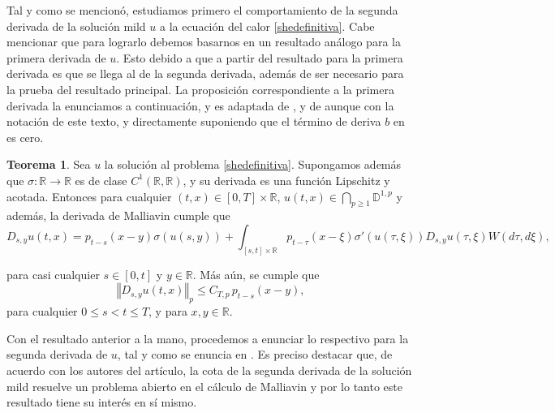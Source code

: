 \documentclass[letterpaper,twoside,12pt]{book}
\newcommand{\R}{\mathbb{R}}
\newcommand{\D}{\mathbb{D}}
\newcommand{\1}{\mathds{1}}
\renewcommand{\to}{\rightarrow}
\newcommand{\norm}[1]{\left\Vert #1 \right\Vert}
\theoremstyle{definition}
\theoremstyle{definition}
\newtheorem{teo}{Teorema}
\theoremstyle{remark}
\theoremstyle{definition}
\theoremstyle{definition}
\theoremstyle{definition}
\theoremstyle{definition}
\theoremstyle{definition}
\begin{document}
Tal y como se mencionó, estudiamos primero el comportamiento de la segunda derivada de la solución mild $u$ a la ecuación del calor \eqref{shedefinitiva}. Cabe mencionar que para lograrlo debemos basarnos en un resultado análogo para la primera derivada de $u$. Esto debido a que a partir del resultado para la primera derivada es que se llega al de la segunda derivada, además de ser necesario para la prueba del resultado principal. La proposición correspondiente a la primera derivada la enunciamos a continuación, y es adaptada de \cite[proposición 5.1]{Nualart2007}, y de \cite[sección 4.1]{KUZGUN202268} aunque con la notación de este texto, y directamente suponiendo que el término de deriva $b$ en \cite{Nualart2007} es cero.

\begin{teo}\label{teocota1eraderivada}
   Sea $u$ la solución al problema \eqref{shedefinitiva}. Supongamos además que $\sigma:\R\to\R$ es de clase $C^1(\R,\R)$, y su derivada es una función Lipschitz y acotada. Entonces para cualquier $(t,x)\in [0,T]\times\R$, $u(t,x)\in\bigcap_{p\geq1}\D^{1,p}$ y además, la derivada de Malliavin cumple que 
   \begin{equation}\label{formula1eraderivada}
      D_{s,y}u(t,x)=p_{t-s}(x-y)\sigma(u(s,y))+ \int_{[s,t]\times\R} p_{t-\tau}(x-\xi)\sigma'(u(\tau,\xi))D_{s,y}u(\tau,\xi)W(d\tau,d\xi),
   \end{equation}
   
   para casi cualquier $s\in [0,t]$ y $y\in \R$. Más aún, se cumple que 
   \begin{equation}\label{cota1eraderivada} 
      \norm{D_{s,y}u(t,x)}_{p}\leq C_{T,p \ }p_{t-s}(x-y),
   \end{equation}
   para cualquier $0\leq s<t\leq T$, y para $x,y\in \R$.
 \end{teo}
Con el resultado anterior a la mano, procedemos a enunciar lo respectivo para la segunda derivada de $u$, tal y como se enuncia en \cite{KUZGUN202268}. Es preciso destacar que, de acuerdo con los autores del artículo, la cota de la segunda derivada de la solución mild resuelve un problema abierto en el cálculo de Malliavin y por lo tanto este resultado tiene su interés en sí mismo.
\end{document}
